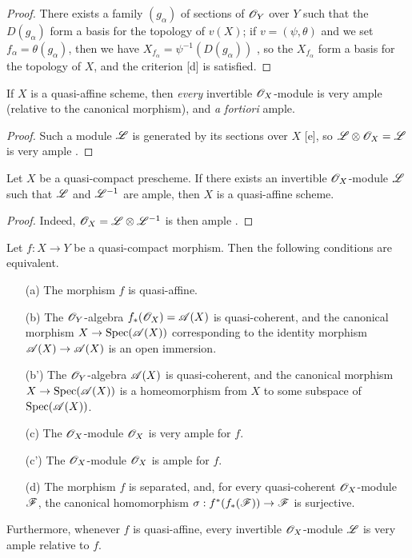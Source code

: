 \begin{proof}
There exists a family $(g_\alpha)$ of sections of $\mathscr{O}_Y$ over $Y$ such that the $D(g_\alpha)$ form a basis for the topology of $v(X)$;
if $v=(\psi,\theta)$ and we set $f_\alpha=\theta(g_\alpha)$, then we have $X_{f_\alpha}=\psi^{-1}(D(g_\alpha))$ , so the $X_{f_\alpha}$ form a basis for the topology of $X$, and the criterion [d] is satisfied.
\end{proof}

\begin{corollary}[5.1.4]
\label{II.5.1.4}
If $X$ is a quasi-affine scheme, then \emph{every} invertible $\mathscr{O}_X$-module is very ample (relative to the canonical morphism), and \emph{a fortiori} ample.
\end{corollary}

\begin{proof}
Such a module $\mathscr{L}$ is generated by its sections over $X$ [e], so $\mathscr{L}\otimes\mathscr{O}_X=\mathscr{L}$ is very ample .
\end{proof}

\begin{corollary}[5.1.5]
\label{II.5.1.5}
Let $X$ be a quasi-compact prescheme.
If there exists an invertible $\mathscr{O}_X$-module $\mathscr{L}$ such that $\mathscr{L}$ and $\mathscr{L}^{-1}$ are ample, then $X$ is a quasi-affine scheme.
\end{corollary}

\begin{proof}
Indeed, $\mathscr{O}_X=\mathscr{L}\otimes\mathscr{L}^{-1}$ is then ample .
\end{proof}

\begin{proposition}[5.1.6]
\label{II.5.1.6}
Let $f:X\to Y$ be a quasi-compact morphism.
Then the following conditions are equivalent.
\begin{enumerate}
  \item[{\rm(a)}] The morphism $f$ is quasi-affine.
  \item[{\rm(b)}] The $\mathscr{O}_Y$-algebra $f_*(\mathscr{O}_X)=\mathscr{A}(X)$ is quasi-coherent, and the canonical morphism $X\to\Spec(\sh{A}(X))$ corresponding to the identity morphism $\sh{A}(X)\to\sh{A}(X)$  is an open immersion.
  \item[{\rm(b')}] The $\mathscr{O}_Y$-algebra $\mathscr{A}(X)$ is quasi-coherent, and the canonical morphism $X\to\Spec(\sh{A}(X))$ is a homeomorphism from $X$ to some subspace of $\operatorname{Spec}(\mathscr{A}(X))$.
  \item[{\rm(c)}] The $\mathscr{O}_X$-module $\mathscr{O}_X$ is very ample for $f$.
  \item[{\rm(c')}] The $\mathscr{O}_X$-module $\mathscr{O}_X$ is ample for $f$.
  \item[{\rm(d)}] The morphism $f$ is separated, and, for every quasi-coherent $\mathscr{O}_X$-module $\mathscr{F}$, the canonical homomorphism $\sigma:f^*(f_*(\sh{F}))\to\sh{F}$  is surjective.
\end{enumerate}

Furthermore, whenever $f$ is quasi-affine, every invertible $\mathscr{O}_X$-module $\mathscr{L}$ is very ample relative to $f$.
\end{proposition}

